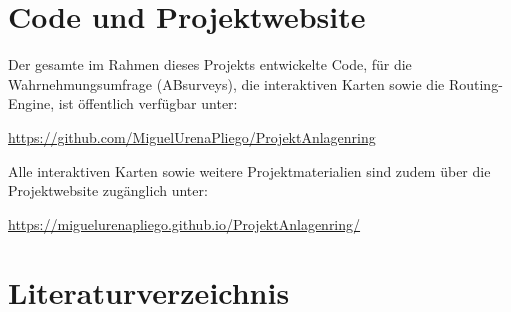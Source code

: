 \documentclass[a4paper,12pt]{article}
\begin{document}
\section{Code und Projektwebsite}

Der gesamte im Rahmen dieses Projekts entwickelte Code, für die Wahrnehmungsumfrage (ABsurveys), die interaktiven Karten sowie die Routing-Engine, ist öffentlich verfügbar unter:
\begin{center}
	\url{https://github.com/MiguelUrenaPliego/ProjektAnlagenring}
\end{center}
Alle interaktiven Karten sowie weitere Projektmaterialien sind zudem über die Projektwebsite zugänglich unter:
\begin{center}
	\url{https://miguelurenapliego.github.io/ProjektAnlagenring/}
\end{center}

\clearpage
\section{Literaturverzeichnis}
\printbibliography[heading=none]
\end{document}
